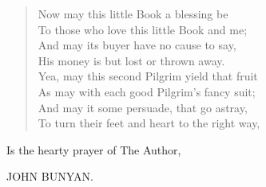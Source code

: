 \begin{verse}
Now may this little Book a blessing be\\
To those who love this little Book and me;\\
And may its buyer have no cause to say,\\
His money is but lost or thrown away.\\
Yea, may this second Pilgrim yield that fruit\\
As may with each good Pilgrim's fancy suit;\\
And may it some persuade, that go astray,\\
To turn their feet and heart to the right way,\\
\end{verse}

Is the hearty prayer of The Author, 

JOHN BUNYAN.
